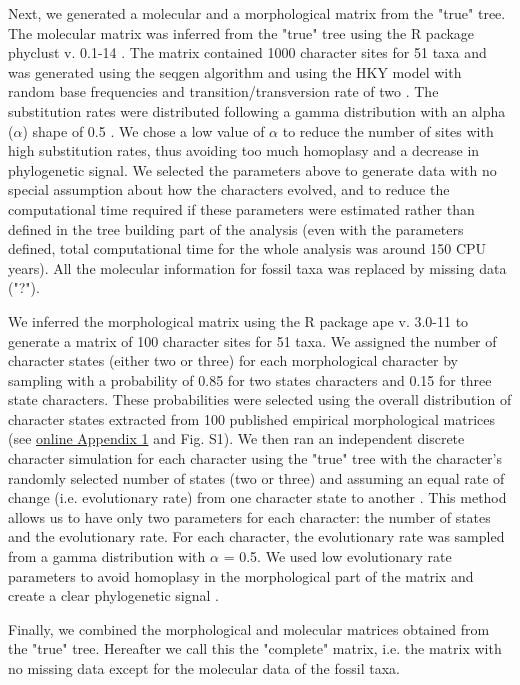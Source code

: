 \documentclass[12pt,letterpaper]{article}
\begin{document}
Next, we generated a molecular and a morphological matrix from the "true" tree. The molecular matrix was inferred from the "true" tree using the R package phyclust v. 0.1-14 \citep{chen2011}. The matrix contained 1000 character sites for 51 taxa and was generated using the seqgen algorithm \citep{ranbaut1997seqgen} and using the HKY model \citep{HKY85} with random base frequencies and transition/transversion rate of two \citep{douadycomparison2003}. The substitution rates were distributed following a gamma distribution with an alpha ($\alpha$) shape of 0.5 \citep{yangamong-site1996}. We chose a low value of $\alpha$ to reduce the number of sites with high substitution rates, thus avoiding too much homoplasy and a decrease in phylogenetic signal. We selected the parameters above to generate data with no special assumption about how the characters evolved, and to reduce the computational time required if these parameters were estimated rather than defined in the tree building part of the analysis (even with the parameters defined, total computational time for the whole analysis was around 150 CPU years). All the molecular information for fossil taxa was replaced by missing data ("?").

We inferred the morphological matrix using the R package ape v. 3.0-11 \citep{paradisape:2004} to generate a matrix of 100 character sites for 51 taxa. We assigned the number of character states (either two or three) for each morphological character by sampling with a probability of 0.85 for two states characters and 0.15 for three state characters. These probabilities were selected using the overall distribution of character states extracted from 100 published empirical morphological matrices (see \hyperref[SupplementaryMaterial]{online Appendix 1} and Fig. S1). We then ran an independent discrete character simulation for each character using the "true" tree with the character's randomly selected number of states (two or three) and assuming an equal rate of change (i.e. evolutionary rate) from one character state to another \citep{Pagel22011994}. This method allows us to have only two parameters for each character: the number of states and the evolutionary rate. For each character, the evolutionary rate was sampled from a gamma distribution with $\alpha$ = 0.5. We used low evolutionary rate parameters to avoid homoplasy in the morphological part of the matrix and create a clear phylogenetic signal \citep{wagner2000,davalosintegrating2014,wrightbayesian2014}.

Finally, we combined the morphological and molecular matrices obtained from the "true" tree. Hereafter we call this the "complete" matrix, i.e. the matrix with no missing data except for the molecular data of the fossil taxa.
\end{document}
